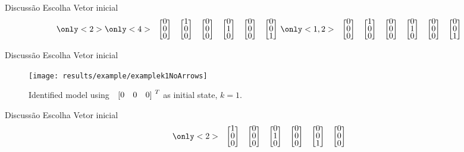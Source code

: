\begin{frame}{Discussão Escolha Vetor inicial}
\begin{align*}
  \label{motif}
{\only<2>{\color{gray}} {\only<4>{\color{blue}}\colvec{0\\0\\0}}\colvec{1\\0\\0}\colvec{0\\0\\0}\colvec{0\\1\\0}\colvec{0\\0\\0}\colvec{0\\0\\1} }
\only<1,2>{\colvec{0\\0\\0}\colvec{1\\0\\0}\colvec{0\\0\\0}\colvec{0\\1\\0}\colvec{0\\0\\0}\colvec{0\\0\\1}}
\end{align*}
\end{frame}


\begin{frame}{Discussão Escolha Vetor inicial}
\begin{figure}[H]
  \centering
 \texttt{[image: results/example/examplek1NoArrows]}
  \caption{Identified model using $\colvec{0&0&0}^T$ as initial state, $k=1$.}
    \label{fig:exampleCol000k1}
\end{figure}
\end{frame}

\begin{frame}{Discussão Escolha Vetor inicial}
\begin{align*}
{\only<2>{\color{blue}}\colvec{1\\0\\0}}\colvec{0\\0\\0}\colvec{0\\1\\0}\colvec{0\\0\\0}\colvec{0\\0\\1}\colvec{0\\0\\0}
\end{align*}
\end{frame}

